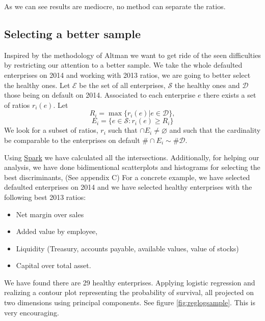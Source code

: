 \documentclass[DIV=calc, paper=a4, fontsize=11pt, twocolumn]{scrartcl}
\begin{document}
As we can see results are mediocre, no method can separate the ratios.

\subsection{Selecting a better sample}
Inspired by the methodology of Altman we want to get ride of the seen difficulties by restricting our attention to a better sample.
We take the whole defaulted enterprises on 2014 and working with 2013 ratios, we are going to better select the healthy ones. 
Let $\mathcal{E}$ be the set of all enterprises, $\mathcal{S}$ the healthy ones and $\mathcal{D}$ those being on default on 2014. 
Associated to each enterprise $e$ there exists a set of ratios $r_i(e)$. Let
$$R_i = \max \{ r_i(e) | e \in \mathcal{D} \},$$
$$E_i = \{ e \in \mathcal{S} : r_i(e) \geq R_i \}$$
We look for a subset of ratios, $r_i$ such that $\cap E_i \neq \varnothing$ and such that the cardinality be comparable to the 
enterprises on default
$\#\cap E_i \sim \#\mathcal{D}$. 

Using \href{http://spark.apache.org/}{Spark} we have calculated all the intersections. Additionally, for helping our
analysis, we have done bidimentional scatterplots and histograms for selecting the best discriminants, (See appendix C)
For a concrete example, we have selected defaulted enterprises on 2014 and we have selected healthy enterprises with the following best 2013 ratios:
\begin{itemize}
\item Net margin over sales
\item Added value by employee, 
\item Liquidity  (Treasury, accounts payable, available values, value of stocks)
\item Capital over total asset.
\end{itemize}
We have found there are 29 healthy enterprises. Applying logistic regression and realizing a contour plot representing the probability 
of survival, all projected on two dimensions using principal components.
See figure \ref{fig:reglogsample}. This is very encouraging.
\end{document}
